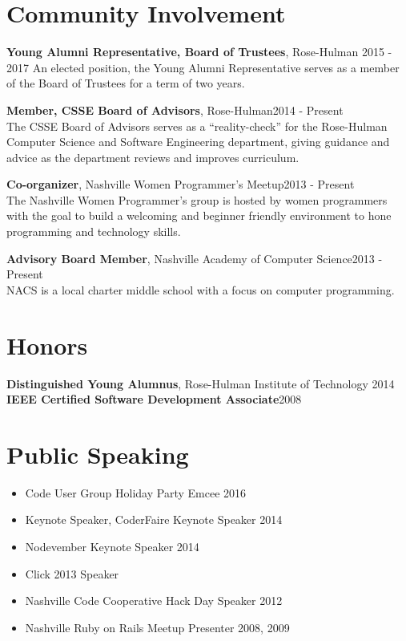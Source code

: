 \documentclass[line, margin, 10pt]{res}
\begin{document}
\begin{resume}
\section{Community Involvement}

{\bf Young Alumni Representative, Board of Trustees}, Rose-Hulman 2015 - 2017
An elected position, the Young Alumni Representative serves as a member of the Board of Trustees for a term of two years.

{\bf Member, CSSE Board of Advisors}, Rose-Hulman\hfill 2014 - Present\\
The CSSE Board of Advisors serves as a ``reality-check'' for the Rose-Hulman Computer Science and Software Engineering department, giving guidance and advice as the department reviews and improves curriculum.

{\bf Co-organizer}, Nashville Women Programmer's Meetup\hfill 2013 - Present\\
The Nashville Women Programmer's group is hosted by women programmers with the goal to build a welcoming and beginner friendly environment to hone programming and technology skills.

{\bf Advisory Board Member}, Nashville Academy of Computer Science\hfill 2013 - Present\\
NACS is a local charter middle school with a focus on computer programming.

\section{Honors}

{\bf Distinguished Young Alumnus}, Rose-Hulman Institute of Technology \hfill 2014\\
{\bf IEEE Certified Software Development Associate}\hfill 2008

\section{Public Speaking}

\begin{itemize}\itemsep -2pt
  \item Code User Group Holiday Party Emcee 2016
  \item Keynote Speaker, CoderFaire Keynote Speaker 2014
  \item Nodevember Keynote Speaker 2014
  \item Click 2013 Speaker
  \item Nashville Code Cooperative Hack Day Speaker 2012
  \item Nashville Ruby on Rails Meetup Presenter 2008, 2009
\end{itemize}


\end{resume}
\end{document}
